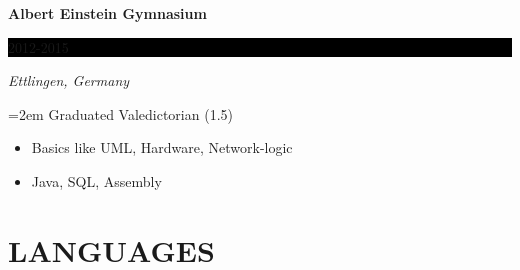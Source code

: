 \documentclass[paper=a4,fontsize=11pt]{scrartcl} %
\newlength{\spacebox}
\newcommand{\sepspace}{\vspace*{1em}}    %
\newcommand{\NewPart}[1]{\section*{\uppercase{{#1}}}}
\newcommand{\PersonalEntry}[2]{
    \noindent\hangindent=2em\hangafter=0 %
    \parbox{\spacebox}{        %
    \textit{#1}}           %
    \hspace{1.5em} #2 \par}    %
\newcommand{\SkillsEntry}[2]{      %
    \noindent\hangindent=2em\hangafter=0 %
    \parbox{\spacebox}{        %
    \textit{#1}}         %
    \hspace{1.5em} \parbox{6\spacebox}{#2} \par}    %
\newcommand{\EducationEntry}[4]{
  \noindent \textbf{#1} \hfill      %
    \colorbox{Black}{%
      \parbox{6em}{%
      \hfill\color{White}#2}} \par  %
      \noindent \textit{#3} \par        %
      \noindent\hangindent=2em\hangafter=0 \small #4 %
    \normalsize \par}
\begin{document}
\sepspace

\EducationEntry{Albert Einstein Gymnasium}{2012-2015}{Ettlingen,
Germany}{Graduated Valedictorian (1.5)
\vspace{5pt}
\begin{itemize}[noitemsep,topsep=0pt]
  \item Basics like UML, Hardware, Network-logic
  \item Java, SQL, Assembly
\end{itemize}
}

\NewPart{Languages}
\sepspace
\end{document}
